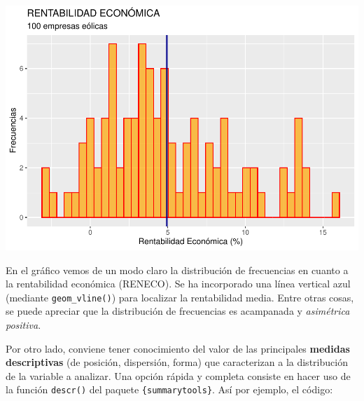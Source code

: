 \documentclass[
]{book}
\newenvironment{Shaded}{\begin{snugshade}}{\end{snugshade}}
\newcommand{\AttributeTok}[1]{\textcolor[rgb]{0.13,0.29,0.53}{#1}}
\newcommand{\ConstantTok}[1]{\textcolor[rgb]{0.56,0.35,0.01}{#1}}
\newcommand{\FunctionTok}[1]{\textcolor[rgb]{0.13,0.29,0.53}{\textbf{#1}}}
\newcommand{\NormalTok}[1]{#1}
\newcommand{\SpecialCharTok}[1]{\textcolor[rgb]{0.81,0.36,0.00}{\textbf{#1}}}
\newcommand{\StringTok}[1]{\textcolor[rgb]{0.31,0.60,0.02}{#1}}
\let\Oldincludegraphics\includegraphics
\renewcommand{\includegraphics}[2][]{%
  \Oldincludegraphics[#1]{#2}%
}
\begin{document}
\includegraphics{_main_files/figure-latex/unnamed-chunk-168-1.pdf}

En el gráfico vemos de un modo claro la distribución de frecuencias en cuanto a la rentabilidad económica (RENECO). Se ha incorporado una línea vertical azul (mediante \texttt{geom\_vline()}) para localizar la rentabilidad media. Entre otras cosas, se puede apreciar que la distribución de frecuencias es acampanada y \emph{asimétrica positiva}.

Por otro lado, conviene tener conocimiento del valor de las principales \textbf{medidas descriptivas} (de posición, dispersión, forma) que caracterizan a la distribución de la variable a analizar. Una opción rápida y completa consiste en hacer uso de la función \texttt{descr()} del paquete \texttt{\{summarytools\}}. Así por ejemplo, el código:

\begin{Shaded}
\end{Shaded}
\end{document}
